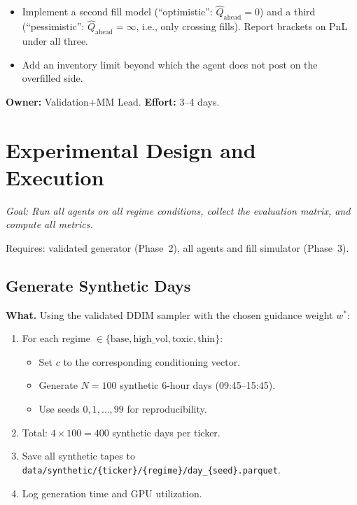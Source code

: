 \documentclass[11pt,a4paper]{article}
\begin{document}
\begin{deepbox}
  \begin{itemize}[nosep]
    \item Implement a second fill model (``optimistic'': $\hat{Q}_{\text{ahead}} = 0$) and a third (``pessimistic'': $\hat{Q}_{\text{ahead}} = \infty$, i.e., only crossing fills).  Report brackets on PnL under all three.
    \item Add an inventory limit beyond which the agent does not post on the overfilled side.
  \end{itemize}
\end{deepbox}

\textbf{Owner:} Validation+MM Lead. \quad \textbf{Effort:} 3--4 days.


\section{Experimental Design and Execution}

\textit{Goal: Run all agents on all regime conditions, collect the evaluation matrix, and compute all metrics.}

\begin{depbox}
  Requires: validated generator (Phase~2), all agents and fill simulator (Phase~3).
\end{depbox}

\subsection{Generate Synthetic Days}

\textbf{What.}
Using the validated DDIM sampler with the chosen guidance weight $w^*$:

\begin{enumerate}[nosep]
  \item For each regime $\in \{\text{base}, \text{high\_vol}, \text{toxic}, \text{thin}\}$:
    \begin{itemize}[nosep]
      \item Set $c$ to the corresponding conditioning vector.
      \item Generate $N = 100$ synthetic 6-hour days (09:45--15:45).
      \item Use seeds $0, 1, \ldots, 99$ for reproducibility.
    \end{itemize}
  \item Total: $4 \times 100 = 400$ synthetic days per ticker.
  \item Save all synthetic tapes to \texttt{data/synthetic/\{ticker\}/\{regime\}/day\_\{seed\}.parquet}.
  \item Log generation time and GPU utilization.
\end{enumerate}
\end{document}
